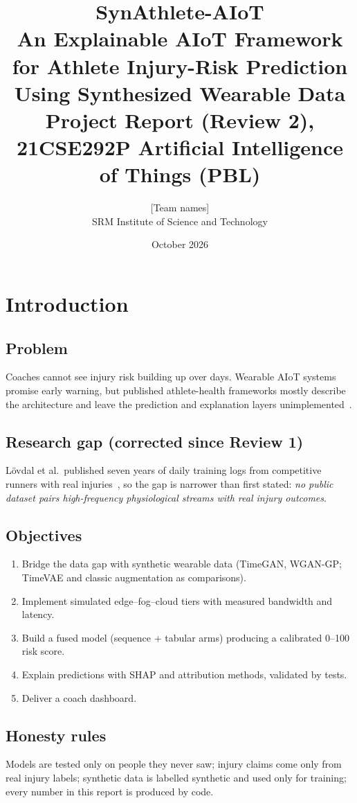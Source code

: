 \documentclass[11pt,a4paper]{report}
\title{SynAthlete-AIoT\\[4pt]\large An Explainable AIoT Framework for Athlete Injury-Risk
Prediction Using Synthesized Wearable Data\\[10pt]\normalsize Project Report (Review 2),
21CSE292P Artificial Intelligence of Things (PBL)}
\author{[Team names]\\ SRM Institute of Science and Technology}
\date{October 2026}
\begin{document}
\maketitle
\tableofcontents

\chapter{Introduction}
\section{Problem}
Coaches cannot see injury risk building up over days. Wearable AIoT systems promise early
warning, but published athlete-health frameworks mostly describe the architecture and leave
the prediction and explanation layers unimplemented~\cite{aiotframework2026}.
\section{Research gap (corrected since Review 1)}
L\"ovdal et al.\ published seven years of daily training logs from \lovdalRunners{} competitive
runners with real injuries~\cite{lovdal2021data}, so the gap is narrower than first stated:
\emph{no public dataset pairs high-frequency physiological streams with real injury outcomes}.
\section{Objectives}
\begin{enumerate}
\item Bridge the data gap with synthetic wearable data (TimeGAN, WGAN-GP; TimeVAE and classic
augmentation as comparisons).
\item Implement simulated edge--fog--cloud tiers with measured bandwidth and latency.
\item Build a fused model (sequence + tabular arms) producing a calibrated 0--100 risk score.
\item Explain predictions with SHAP and attribution methods, validated by tests.
\item Deliver a coach dashboard.
\end{enumerate}
\section{Honesty rules}
Models are tested only on people they never saw; injury claims come only from real injury
labels; synthetic data is labelled synthetic and used only for training; every number in this
report is produced by code.
\end{document}

